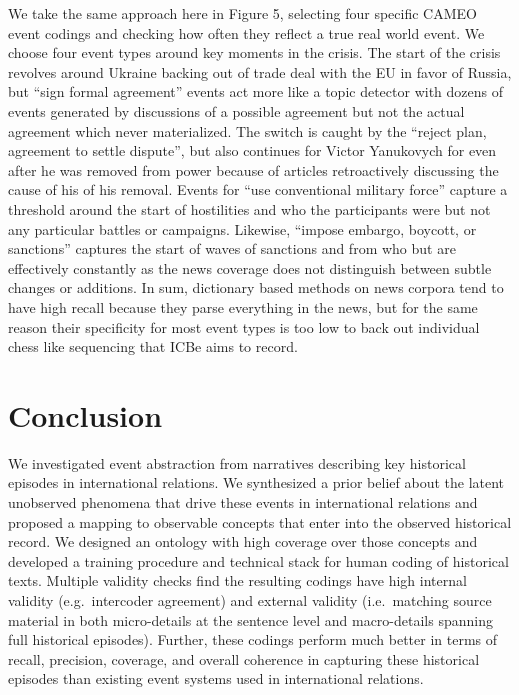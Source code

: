 \documentclass[9pt,twocolumn,twoside,lineno]{pnas-new}
\begin{document}
We take the same approach here in Figure 5, selecting four specific
CAMEO event codings and checking how often they reflect a true real
world event. We choose four event types around key moments in the
crisis. The start of the crisis revolves around Ukraine backing out of
trade deal with the EU in favor of Russia, but ``sign formal agreement''
events act more like a topic detector with dozens of events generated by
discussions of a possible agreement but not the actual agreement which
never materialized. The switch is caught by the ``reject plan, agreement
to settle dispute'', but also continues for Victor Yanukovych for even
after he was removed from power because of articles retroactively
discussing the cause of his of his removal. Events for ``use
conventional military force'' capture a threshold around the start of
hostilities and who the participants were but not any particular battles
or campaigns. Likewise, ``impose embargo, boycott, or sanctions''
captures the start of waves of sanctions and from who but are
effectively constantly as the news coverage does not distinguish between
subtle changes or additions. In sum, dictionary based methods on news
corpora tend to have high recall because they parse everything in the
news, but for the same reason their specificity for most event types is
too low to back out individual chess like sequencing that ICBe aims to
record.



\hypertarget{format}{%
\section*{Conclusion}\label{format}}

We investigated event abstraction from narratives describing key
historical episodes in international relations. We synthesized a prior
belief about the latent unobserved phenomena that drive these events in
international relations and proposed a mapping to observable concepts
that enter into the observed historical record. We designed an ontology
with high coverage over those concepts and developed a training
procedure and technical stack for human coding of historical texts.
Multiple validity checks find the resulting codings have high internal
validity (e.g.~intercoder agreement) and external validity
(i.e.~matching source material in both micro-details at the sentence
level and macro-details spanning full historical episodes). Further,
these codings perform much better in terms of recall, precision,
coverage, and overall coherence in capturing these historical episodes
than existing event systems used in international relations.
\end{document}
